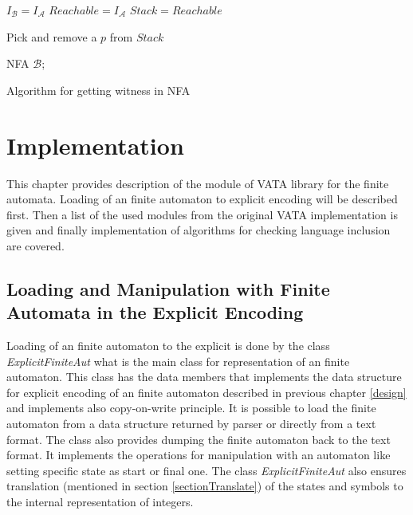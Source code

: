 \begin{algorithm}[H]
	\label{algCandidate}



  $I_\mathcal{B} = I_\mathcal{A}$\;
  $Reachable = I_\mathcal{A}$\;
  $Stack = Reachable$\;
	
   {
			Pick and remove a $p$ from $Stack$\;
	}

	\Return NFA $\mathcal{B}$;
	\caption{Algorithm for getting witness in NFA}
\end{algorithm}



\chapter{Implementation}
\label{implementation}
This chapter provides description of the module of VATA library for the finite automata. Loading of an finite
automaton to explicit encoding will be described first. 
Then a list of the used modules from the original VATA implementation is given and finally implementation of algorithms 
for checking language inclusion are covered.

\section{Loading and Manipulation with Finite Automata in the Explicit Encoding}
Loading of an finite automaton to the explicit is done by  the class \emph{ExplicitFiniteAut} what is the main class for representation of an finite automaton. 
This class has the data members that implements the data structure for explicit encoding of an finite automaton described in previous chapter \ref{design} and
implements also copy-on-write principle. 
It is possible to load the finite automaton from a data structure returned by parser or directly from a text format. The class also provides dumping
the finite automaton back to the text format.
It implements the operations for manipulation with an automaton like setting specific state as start or final one.
The class \emph{ExplicitFiniteAut} also ensures translation (mentioned in section \ref{sectionTranslate}) of the states 
and symbols to the internal representation of integers. 

